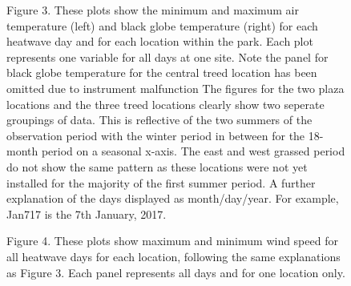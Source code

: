 \documentclass[twocolumn, a4paper]{article}
\begin{document}
\begin{figure}
	\begin{center}
		\caption{Figure 3. These plots show the minimum and maximum air temperature (left) and black globe temperature (right) for each heatwave day and for each location within the park. Each plot represents one variable for all days at one site. Note the panel for black globe temperature for the central treed location has been omitted due to instrument malfunction The figures for the two plaza locations and the three treed locations clearly show two seperate groupings of data. This is reflective of the two summers of the observation period with the winter period in between for the 18-month period on a seasonal x-axis. The east and west grassed period do not show the same pattern as these locations were not yet installed for the majority of the first summer period. A further explanation of the days displayed as month/day/year. For example, Jan717 is the 7th January, 2017. \label{fig:prior_uncertainties}}
	\end{center}
\end{figure}

\begin{figure}
	\begin{center}
		\caption{Figure 4. These plots show maximum and minimum wind speed for all heatwave days for each location, following the same explanations as Figure 3. Each panel represents all days and for one location only. \label{fig:prior_uncertainties}}
	\end{center}
\end{figure}
\end{document}
